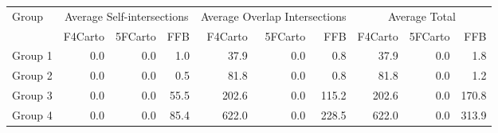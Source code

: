 
\begin{tabular}{lrrr|rrr|rrr}
\toprule
\multirow{2}{*}{Group} & \multicolumn{3}{c}{Average Self-intersections} & \multicolumn{3}{c}{Average Overlap Intersections} & \multicolumn{3}{c}{Average Total} \\
\cmidrule(lr){2-4}\cmidrule(lr){5-7}\cmidrule(lr){8-10}
                   & F4Carto & 5FCarto & FFB & F4Carto & 5FCarto & FFB & F4Carto & 5FCarto & FFB \\
\midrule

Group 1 & 0.0 & 0.0 & 1.0 & 37.9 & 0.0 & 0.8 & 37.9 & 0.0 & 1.8 \\
Group 2 & 0.0 & 0.0 & 0.5 & 81.8 & 0.0 & 0.8 & 81.8 & 0.0 & 1.2 \\
Group 3 & 0.0 & 0.0 & 55.5 & 202.6 & 0.0 & 115.2 & 202.6 & 0.0 & 170.8 \\
Group 4 & 0.0 & 0.0 & 85.4 & 622.0 & 0.0 & 228.5 & 622.0 & 0.0 & 313.9 \\
\bottomrule
\end{tabular}
